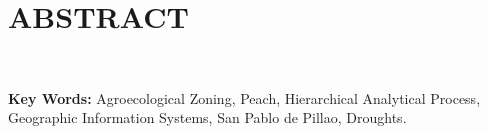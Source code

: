 \chapter*{ABSTRACT}

\lipsum[1]

\lipsum[2]\\\vspace{1em}

\textbf{Key Words:} Agroecological Zoning, Peach, Hierarchical Analytical Process, Geographic Information Systems, San Pablo de Pillao, Droughts.